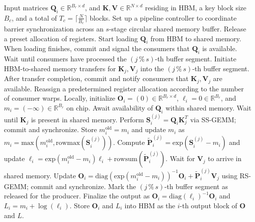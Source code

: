 \begin{algorithm}[H]
    \caption{\small\label{alg:flash3_wgmma_ws_only}\textsc{FlashAttention-3} forward pass \textbf{without} intra-consumer overlapping -- CTA perspective}
    \begin{algorithmic}[1]
\REQUIRE Input matrices $\mathbf{Q}_i \in \mathbb{R}^{B_r \times d}$, and $\mathbf{K}, \mathbf{V} \in \mathbb{R}^{N \times d}$ residing in HBM, a key block size $B_c$, and a total of $T_c = \lceil \frac{N}{B_c} \rceil$ blocks.
\STATE Set up a pipeline controller to coordinate barrier synchronization across an $s$-stage circular shared memory buffer.
\STATE Release a preset allocation of registers.
\STATE Start loading $\mathbf{Q}_i$ from HBM to shared memory.
\STATE When loading finishes, commit and signal the consumers that $\mathbf{Q}_i$ is available.
    \STATE Wait until consumers have processed the $(j\,\%\,s)$-th buffer segment.
    \STATE Initiate HBM-to-shared memory transfers for $\mathbf{K}_j, \mathbf{V}_j$ into the $(j\,\%\,s)$-th buffer segment.
    \STATE After transfer completion, commit and notify consumers that $\mathbf{K}_j, \mathbf{V}_j$ are available.
\ENDFOR
\ELSE \STATE Reassign a predetermined register allocation according to the number of consumer warps.
\STATE Locally, initialize $\mathbf{O}_i = (0) \in \mathbb{R}^{B_r \times d}$, $\ell_i = 0 \in \mathbb{R}^{B_r}$, and $m_i = (-\infty) \in \mathbb{R}^{B_r}$ on chip.
\STATE Await availability of $\mathbf{Q}_i$ within shared memory.
\STATE Wait until $\mathbf{K}_j$ is present in shared memory.
\STATE Perform $\mathbf{S}_i^{(j)} = \mathbf{Q}_i \mathbf{K}_j^T$ via SS-GEMM; commit and synchronize. \label{alg:ws_only_gemm1}
\STATE Store $m_i^{\mathrm{old}} = m_i$ and update $m_i$ as $m_i = \mathrm{max}(m_i^{\mathrm{old}}, \mathrm{rowmax}(\mathbf{S}_i^{(j)}))$. \label{code-ws:softmax_start}
\STATE Compute $\widetilde{\mathbf{P}}_i^{(j)} = \mathrm{exp}(\mathbf{S}_i^{(j)} - m_i)$ and update $\ell_i = \mathrm{exp}(m_i^{\mathrm{old}} - m_i) \ell_i + \mathrm{rowsum}(\widetilde{\mathbf{P}}_i^{(j)})$. \label{code-ws:softmax_end}
\STATE Wait for $\mathbf{V}_j$ to arrive in shared memory.
\STATE Update $\mathbf{O}_i = \mathrm{diag}(\mathrm{exp}(m_i^{\mathrm{old}} - m_i))^{-1} \mathbf{O}_i + \widetilde{\mathbf{P}}_i^{(j)} \mathbf{V}_j$ using RS-GEMM; commit and synchronize. \label{alg:ws_only_gemm2}
\STATE Mark the $(j\,\%\,s)$-th buffer segment as released for the producer.
\ENDFOR
\STATE Finalize the output as $\mathbf{O}_i = \mathrm{diag}(\ell_i)^{-1} \mathbf{O}_i$ and $L_i = m_i + \log(\ell_i)$.
\STATE Store $\mathbf{O}_i$ and $L_i$ into HBM as the $i$-th output block of $\mathbf{O}$ and $L$.
\ENDIF
\end{algorithmic}
\end{algorithm}

